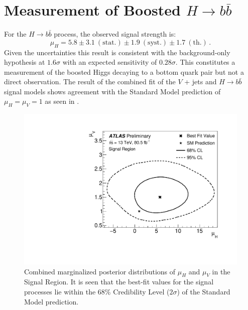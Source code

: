 \section{Measurement of Boosted $H \rightarrow b\bar{b}$} \label{sec:results:procedure}

For the $H \rightarrow b\bar{b}$ process, the observed signal strength is:
%
$$ \mu_{H} = 5.8 \pm 3.1~\mathrm{(stat.)} \pm 1.9~\mathrm{(syst.)} \pm 1.7~\mathrm{(th.)}\,. $$
%
Given the uncertainties this result is consistent with the background-only
hypothesis at $1.6\sigma$ with an expected sensitivity of $0.28\sigma$.  This
constitutes a measurement of the boosted Higgs decaying to a bottom quark pair
but not a direct observation. The result of the combined fit of the $V$ + jets
and $H \rightarrow b\bar{b}$ signal models shows agreement with the Standard
Model prediction of $\mu_{H} = \mu_{V} = 1$ as seen in
.
%
\begin{figure}
\centering
\includegraphics[width=.6\linewidth]{figures/results/contour}
\caption{\cite{ATLAS-CONF-2018-052}
Combined marginalized posterior distributions of $\mu_{H}$ and $\mu_{V}$ in the
Signal Region.  It is seen that the best-fit values for the signal processes
lie within the 68\% Credibility Level ($2\sigma$) of the Standard Model
prediction.}
\label{sec:results:contour}
\end{figure}
